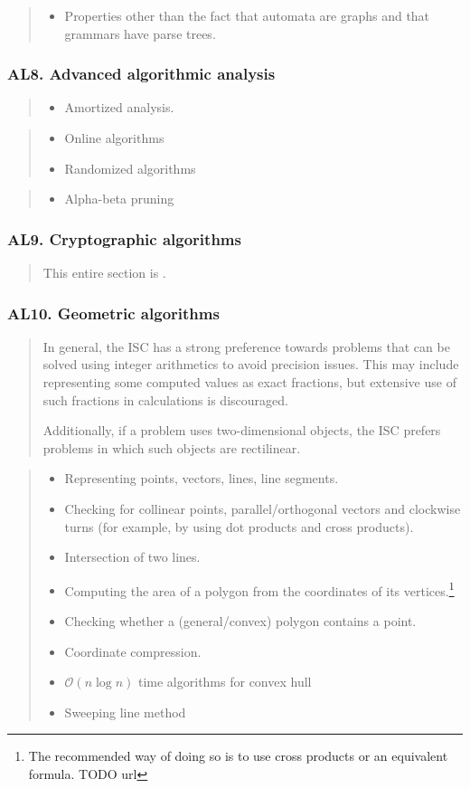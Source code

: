 \documentclass[a4paper,11pt,oneside]{article}
\newcommand{\cmark}{\ding{51}}%
\newcommand{\xmark}{\ding{55}}%
\newcommand{\ccode}{{\small\cmark\faFileText}}
\newcommand{\cnfoc}{{\small\faQuestion}}
\newcommand{\cexcl}{{\small\xmark}}
\newcommand{\Icodeonly}{\item[\hbox to 1.8em{\ccode\hfill}]}
\newcommand{\Inofocus}{\item[\hbox to 1.8em{\cnfoc\hfill}]}
\newcommand{\Iexcluded}{\item[\hbox to 1.8em{\cexcl\hfill}]}
\newenvironment{myitemize}{\begin{quote}\begin{itemize}\itemsep 0pt}{\end{itemize}\end{quote}}
\begin{document}
    \begin{myitemize}
    \Iexcluded Properties other than the fact that automata are graphs and that grammars have parse trees.
    \end{myitemize}
  
    \subsubsection*{AL8. Advanced algorithmic analysis}%

    \begin{myitemize}
    \Icodeonly Amortized analysis.
    \end{myitemize}

    \begin{myitemize}
    \Inofocus Online algorithms
    \Inofocus Randomized algorithms
    \end{myitemize}

    \begin{myitemize}
    \Iexcluded Alpha-beta pruning
    \end{myitemize}
    
    \subsubsection*{AL9. Cryptographic algorithms}%

    \begin{quote}
    This entire section is \cnfoc.
    \end{quote}

    \subsubsection*{AL10. Geometric algorithms}%

    \begin{quote}
    In general, the ISC has a strong preference towards problems that can be solved using integer
    arithmetics to avoid precision issues. This may include representing some computed values as 
    exact fractions, but extensive use of such fractions in calculations is discouraged.

    Additionally, if a problem uses two-dimensional objects, the ISC prefers problems in which such objects are rectilinear.
    \end{quote}

    \begin{myitemize}
    \Icodeonly Representing points, vectors, lines, line segments.
    \Icodeonly Checking for collinear points, parallel/orthogonal vectors and clockwise turns (for example, by using dot products and cross products).
    \Icodeonly Intersection of two lines.
    \Icodeonly Computing the area of a polygon from the coordinates of its vertices.\footnote{The recommended way of doing so is to use cross products or an equivalent formula. TODO url}
    \Icodeonly Checking whether a (general/convex) polygon contains a point.
    \Icodeonly Coordinate compression.
    \Icodeonly $\mathcal{O}(n\log{n})$ time algorithms for convex hull
    \Icodeonly Sweeping line method
    \end{myitemize}
  
\end{document}
